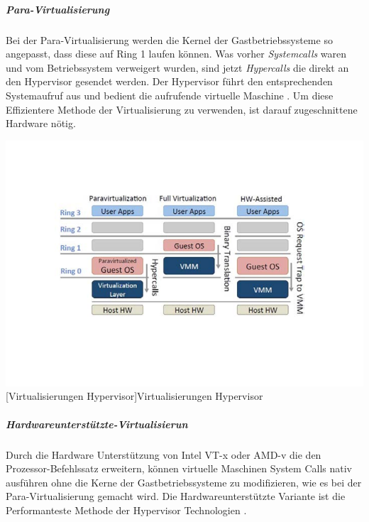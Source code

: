  \subparagraph{Para-Virtualisierung}
 Bei der Para-Virtualisierung werden die Kernel der Gastbetriebssysteme so angepasst, dass diese auf Ring 1 laufen können. Was vorher \emph{Systemcalls} waren und vom Betriebssystem verweigert wurden, sind jetzt \emph{Hypercalls} die direkt an den Hypervisor gesendet werden. Der Hypervisor führt den entsprechenden Systemaufruf aus und bedient die aufrufende virtuelle Maschine \cite{Meinel2011VirtualisierungMarktubersicht}. Um diese Effizientere Methode der Virtualisierung zu verwenden, ist darauf zugeschnittene Hardware nötig.

\vspace{1em}
\begin{minipage}{\linewidth}
	\centering
	\includegraphics[width=1\linewidth]{pics/02Virtualisierungen_Hypervisor.PNG}
	[Virtualisierungen Hypervisor]{Virtualisierungen Hypervisor \cite{Fayyad-Kazan2013BenchmarkingHypervisors}}
	\label{fig:Virtualisierungen_Hypervisor}
\end{minipage}
 
\subparagraph{Hardwareunterstützte-Virtualisierun}
Durch die Hardware Unterstützung von Intel VT-x\cite{TechnologyIntel} oder AMD-v\cite{AMDVirtualisierungstechnologie} die den Prozessor-Befehlssatz erweitern, können virtuelle Maschinen System Calls nativ ausführen ohne die Kerne der Gastbetriebssysteme zu modifizieren, wie es bei der Para-Virtualisierung gemacht wird. Die Hardwareunterstützte Variante ist die Performanteste Methode der Hypervisor Technologien \cite{Meinel2011VirtualisierungMarktubersicht}.




